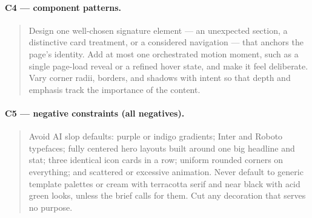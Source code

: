 \paragraph{C4 --- component patterns.}
\begin{quote}\small
Design one well-chosen signature element --- an unexpected section, a distinctive card treatment, or a
considered navigation --- that anchors the page's identity. Add at most one orchestrated motion moment,
such as a single page-load reveal or a refined hover state, and make it feel deliberate. Vary corner
radii, borders, and shadows with intent so that depth and emphasis track the importance of the content.
\end{quote}
\paragraph{C5 --- negative constraints (all negatives).}
\begin{quote}\small
Avoid AI slop defaults: purple or indigo gradients; Inter and Roboto typefaces; fully centered hero
layouts built around one big headline and stat; three identical icon cards in a row; uniform rounded
corners on everything; and scattered or excessive animation. Never default to generic template palettes
or cream with terracotta serif and near black with acid green looks, unless the brief calls for them.
Cut any decoration that serves no purpose.
\end{quote}

